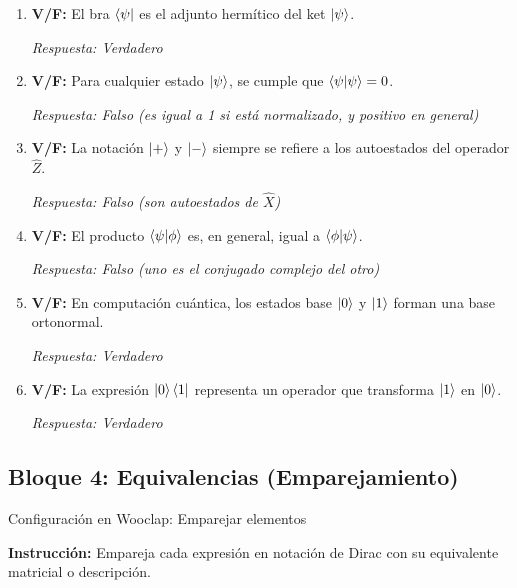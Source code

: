 \documentclass{unirTema}
\begin{document}
\begin{enumerate}
  \item \textbf{V/F:} El bra $\bra{\psi}$ es el adjunto hermítico del ket $\ket{\psi}$.

        \textit{Respuesta: Verdadero}

  \item \textbf{V/F:} Para cualquier estado $\ket{\psi}$, se cumple que $\braket{\psi}{\psi} = 0$.

        \textit{Respuesta: Falso (es igual a 1 si está normalizado, y positivo en general)}

  \item \textbf{V/F:} La notación $\ket{+}$ y $\ket{-}$ siempre se refiere a los autoestados del operador $\hat{Z}$.

        \textit{Respuesta: Falso (son autoestados de $\hat{X}$)}

  \item \textbf{V/F:} El producto $\braket{\psi}{\phi}$ es, en general, igual a $\braket{\phi}{\psi}$.

        \textit{Respuesta: Falso (uno es el conjugado complejo del otro)}

  \item \textbf{V/F:} En computación cuántica, los estados base $\ket{0}$ y $\ket{1}$ forman una base ortonormal.

        \textit{Respuesta: Verdadero}

  \item \textbf{V/F:} La expresión $\ket{0}\bra{1}$ representa un operador que transforma $\ket{1}$ en $\ket{0}$.

        \textit{Respuesta: Verdadero}
\end{enumerate}

\subsection*{Bloque 4: Equivalencias (Emparejamiento)}

Configuración en Wooclap: Emparejar elementos

\textbf{Instrucción:} Empareja cada expresión en notación de Dirac con su equivalente matricial o descripción.
\end{document}
